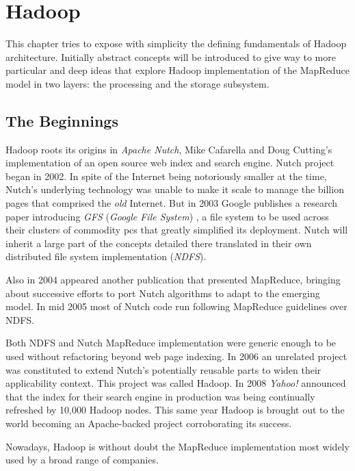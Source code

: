 \chapter{Hadoop}\label{cap:hadoop}
\noindent This chapter tries to expose with simplicity the defining fundamentals of Hadoop architecture. Initially abstract concepts will be introduced to give way to more particular and deep ideas that explore Hadoop implementation of the MapReduce model in two layers: the processing and the storage subsystem.

\section{The Beginnings}\label{sec:origen}
\noindent Hadoop roots its origins in \emph{Apache Nutch}, Mike Cafarella and Doug Cutting's implementation of an open source web index and search engine. Nutch project began in 2002. In spite of the Internet being notoriously smaller at the time, Nutch's underlying technology was unable to make it scale to manage the billion pages that comprised the \emph{old} Internet. But in 2003 Google publishes a research paper introducing \emph{GFS} (\emph{Google File System}) \cite{gfs}, a file system to be used across their clusters of commodity pcs that greatly simplified its deployment. Nutch will inherit a large part of the concepts detailed there translated in their own distributed file system implementation (\emph{NDFS}).

Also in 2004 appeared another publication \cite{googlemapreduce} that presented MapReduce, bringing about successive efforts to port Nutch algorithms to adapt to the emerging model. In mid 2005 most of Nutch code run following MapReduce guidelines over NDFS.

Both NDFS and Nutch MapReduce implementation were generic enough to be used without refactoring beyond web page indexing. In 2006 an unrelated project was constituted to extend Nutch's potentially reusable parts to widen their applicability context. This project was called Hadoop. In 2008 \emph{Yahoo!} announced that the index for their search engine in production was being continually refreshed by 10,000 Hadoop nodes. This same year Hadoop is brought out to the world becoming an Apache-backed project corroborating its success.

Nowadays, Hadoop is without doubt the MapReduce implementation most widely used by a broad range of companies.

